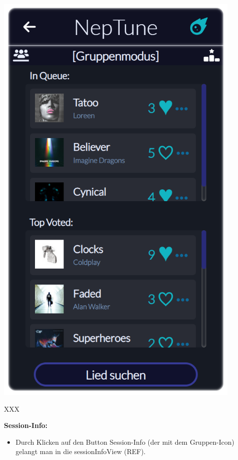 \documentclass[oneside, ngerman]{sdqtechreport}
\begin{document}
\begin{minipage}{0.5\textwidth}
    \hypertarget{hostControlView}{}
    \includegraphics[width=0.9\textwidth]{LATEX/Pflichtenheft/GraphicDesigns/hostControlPage.png}
\end{minipage} 
\hfill
\begin{minipage}{0.5\textwidth}
    XXX
\end{minipage}

\textbf{Session-Info:}
\begin{itemize}
    \item Durch Klicken auf den Button Session-Info (der mit dem Gruppen-Icon) gelangt man in die sessionInfoView (REF).
\end{itemize}
\end{document}
